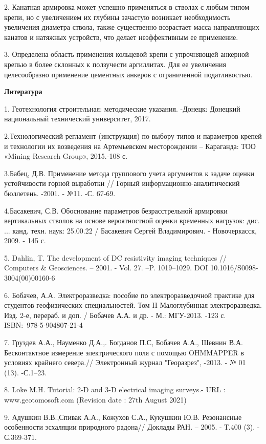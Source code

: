 \begin{multicols}{2}
2. Канатная армировка может успешно применяться в стволах с любым типом
крепи, но с увеличением их глубины зачастую возникает необходимость
увеличения диаметра ствола, также существенно возрастает масса
направляющих канатов и натяжных устройств, что делает неэффективным ее
применение.

3. Определена область применения кольцевой крепи с упрочняющей анкерной
крепью в более склонных к ползучести аргиллитах. Для ее увеличения
целесообразно применение цементных анкеров с ограниченной податливостью.
\end{multicols}

\begin{center}
{\bfseries Литература}
\end{center}

\begin{noparindent}
1. Геотехнология строительная: методические указания. -Донецк: Донецкий
национальный технический университет, 2017.

2.Технологический регламент (инструкция) по выбору типов и параметров
крепей и технологии их возведения на Артемьевском месторождении --
Караганда: ТОО «Mining Research Group», 2015.-108 с.

3.Бабец, Д.В. Применение метода группового учета аргументов к задаче
оценки устойчивости горной выработки // Горный
информационно-аналитический бюллетень. -2001. - №11. -С. 67-69.

4.Басакевич, С.В. Обоснование параметров безрасстрельной армировки
вертикальных стволов на основе вероятностной оценки временных нагрузок:
дис. ... канд. техн. наук: 25.00.22 / Басакевич Сергей Владимирович. -
Новочеркасск, 2009. - 145 с.

5. Dahlin, T. The development of DC resistivity imaging techniques //
Computers \& Geosciences. -- 2001. - Vol. 27. --P. 1019--1029. DOI
10.1016/S0098-3004(00)00160-6

6. Бобачев, А.А. Электроразведка: пособие по электроразведочной практике
для студентов геофизических специальностей. Том II Малоглубинная
электроразведка. Изд. 2-е, перераб. и доп. / Бобачев А.А. и др. - М.:
МГУ-2013. -123 с. ISBN:~978-5-904807-21-4

7. Груздев А.А., Науменко Д.А.,. Богданов П.С, Бобачев А.А., Шевнин В.А.
Бесконтактное измерение электрического поля с помощью OHMMAPPER в
условиях крайнего севера.// Электронный журнал "Георазрез", -2013. - №
01 (13). -С.1--23.

8. Loke M.H. Tutorial: 2-D and 3-D electrical imaging surveys.- URL :
www.geotomosoft.com (Revision date : 27th August 2021)

9. Адушкин В.В.,Спивак А.А., Кожухов С.А., Кукушкин Ю.В. Резонансные
особенности эсхаляции природного радона// Доклады РАН. -- 2005. - Т.400
(3). - С.369-371.
\end{noparindent}

